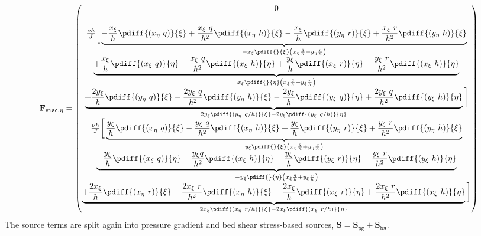 	\begin{align}
		\mathbf{F}_{\texttt{visc},\eta}=
		\begin{pmatrix}
			0 \\
			\\
			\frac{\nu h}{J} \bigg[
			\underbrace{- \frac{x_{\xi} }{h}\pdiff{(x_{\eta}\ q)}{\xi}
				+ \frac{x_{\xi}\ q}{h^2}\pdiff{(x_{\eta}\ h)}{\xi}
				- \frac{x_{\xi}}{h} \pdiff{(y_{\eta}\ r)}{\xi}
				+ \frac{x_{\xi}\ r}{h^2}\pdiff{(y_{\eta}\ h)}{\xi}}_{ - x_{\xi} \pdiff{}{\xi}\left( x_{\eta}\frac{q}{h} + y_{\eta}\frac{r}{h}  \right)}\\
			\underbrace{+\frac{x_{\xi}}{h} \pdiff{(x_{\xi}\ q)}{\eta}
				-\frac{x_{\xi}\ q}{h^2}\pdiff{(x_{\xi}\ h)}{\eta}
				+ \frac{y_{\xi}}{h} \pdiff{(x_{\xi}\ r)}{\eta}
				- \frac{y_{\xi}\ r}{h^2} \pdiff{(x_{\xi}\ h)}{\eta}}_{ x_{\xi} \pdiff{}{\eta}\left( x_{\xi} \frac{q}{h} + y_{\xi} \frac{r}{h}  \right)}\\
			\underbrace{+ \frac{2 y_{\xi}}{h} \pdiff{(y_{\eta}\ q)}{\xi}
				- \frac{2 y_{\xi}\ q}{h^2} \pdiff{(y_{\eta}\ h)}{\xi}
				- \frac{2 y_{\xi}}{h} \pdiff{(y_{\xi}\ q)}{\eta}
				+ \frac{2 y_{\xi}\ q}{h^2} \pdiff{(y_{\xi}\ h)}{\eta} }_{        2 y_{\xi} \pdiff{(y_{\eta}\ q/h)}{\xi}
				- 2 y_{\xi} \pdiff{(y_{\xi}\ q/h)}{\eta}}
			\bigg]\\
			\frac{\nu h}{J} \bigg[
			\underbrace{\frac{y_{\xi} }{h} \pdiff{(x_{\eta}\ q)}{\xi}
				- \frac{y_{\xi}\ q}{h^2} \pdiff{(x_{\eta}\ h)}{\xi}
				+ \frac{y_{\xi} }{h} \pdiff{(y_{\eta}\ r)}{\xi}
				+ \frac{y_{\xi}\ r}{h^2} \pdiff{(y_{\eta}\ h)}{\xi}}_{y_{\xi} \pdiff{}{\xi} \left(x_{\eta} \frac{q}{h}
				+ y_{\eta} \frac{r}{h} \right)} \\
			\underbrace{- \frac{y_{\xi}}{h} \pdiff{(x_{\xi}\ q)}{\eta}
				+ \frac{y_{\xi}q}{h^2} \pdiff{(x_{\xi}\ h)}{\eta}
				- \frac{y_{\xi}}{h} \pdiff{(y_{\xi}\ r)}{\eta}
				- \frac{y_{\xi}\ r}{h^2} \pdiff{(y_{\xi}\ h)}{\eta}}_{- y_{\xi} \pdiff{}{\eta} \left( x_{\xi} \frac{q}{h} +  y_{\xi} \frac{r}{h} \right)} \\
			\underbrace{+ \frac{2 x_{\xi}}{h} \pdiff{(x_{\eta}\ r)}{\xi}
				- \frac{2 x_{\xi}\ r}{h^2} \pdiff{(x_{\eta}\ h)}{\xi}
				- \frac{2 x_{\xi}}{h} \pdiff{(x_{\xi}\ r)}{\eta}
				+ \frac{2 x_{\xi}\ r}{h^2} \pdiff{(x_{\xi}\ h)}{\eta}}_{2 x_{\xi} \pdiff{(x_{\eta}\ r/h)}{\xi}
				- 2 x_{\xi} \pdiff{(x_{\xi}\ r/h)}{\eta}}
			\bigg]
		\end{pmatrix}
	\end{align}
The source terms are split again into pressure gradient and bed shear stress-based sources, $\mathbf{S} = \mathbf{S}_{\texttt{pg}} + \mathbf{S}_{\texttt{bs}}$.
